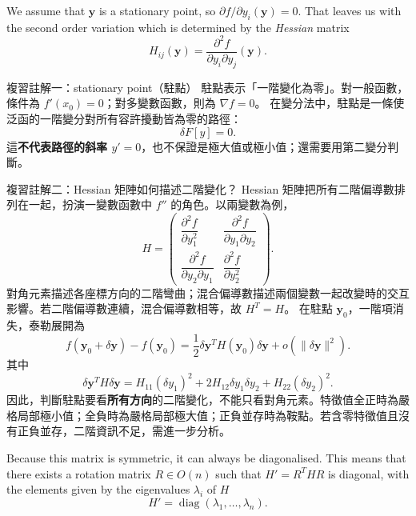\documentclass[11pt,a4paper,twoside]{article}
\newcommand{\pnum}[1]{\makebox[0pt][r]{\scriptsize\textbf{[#1]}\hspace{0.7em}}}
\newcommand{\StudyNote}[2]{\begin{studyNote}{#1}#2\end{studyNote}}
\begin{document}
\noindent\pnum{45}We assume that $\mathbf{y}$ is a stationary point, so $\partial f/\partial y_i(\mathbf{y})=0$. That leaves us with the second order variation which is determined by the \textit{Hessian} matrix
\begin{equation}
    H_{ij}(\mathbf{y})=\frac{\partial^2 f}{\partial y_i\partial y_j}(\mathbf{y}).
    \tag{7.29}
\end{equation}

\StudyNote{複習註解一：stationary point（駐點）}{
    駐點表示「一階變化為零」。對一般函數，條件為 $f'(x_0)=0$；對多變數函數，則為 $\nabla f=0$。
    在變分法中，駐點是一條使泛函的一階變分對所有容許擾動皆為零的路徑：
    \[
        \delta F[y]=0.
    \]
    這\textbf{不代表路徑的斜率 $y'=0$}，也不保證是極大值或極小值；還需要用第二變分判斷。
}
\StudyNote{複習註解二：Hessian 矩陣如何描述二階變化？}{
    Hessian 矩陣把所有二階偏導數排列在一起，扮演一變數函數中 $f''$ 的角色。以兩變數為例，
    \[
        H=\begin{pmatrix}
            \dfrac{\partial^2 f}{\partial y_1^2}           & \dfrac{\partial^2 f}{\partial y_1\partial y_2} \\[2mm]
            \dfrac{\partial^2 f}{\partial y_2\partial y_1} & \dfrac{\partial^2 f}{\partial y_2^2}
        \end{pmatrix}.
    \]
    對角元素描述各座標方向的二階彎曲；混合偏導數描述兩個變數一起改變時的交互影響。若二階偏導數連續，混合偏導數相等，故 $H^T=H$。
    在駐點 $\mathbf y_0$，一階項消失，泰勒展開為
    \[
        f(\mathbf y_0+\delta\mathbf y)-f(\mathbf y_0)
        =\frac12\delta\mathbf y^T H(\mathbf y_0)\delta\mathbf y
        +o(\|\delta\mathbf y\|^2).
    \]
    其中
    \[
        \delta\mathbf y^TH\delta\mathbf y
        =H_{11}(\delta y_1)^2+2H_{12}\delta y_1\delta y_2+H_{22}(\delta y_2)^2.
    \]
    因此，判斷駐點要看\textbf{所有方向}的二階變化，不能只看對角元素。特徵值全正時為嚴格局部極小值；全負時為嚴格局部極大值；正負並存時為鞍點。若含零特徵值且沒有正負並存，二階資訊不足，需進一步分析。
}


\noindent\pnum{46}Because this matrix is symmetric, it can always be diagonalised. This means that there exists a rotation matrix $R\in O(n)$ such that $H'=R^T H R$ is diagonal, with the elements given by the eigenvalues $\lambda_i$ of $H$
\begin{equation}
    H'=\operatorname{diag}(\lambda_1,\ldots,\lambda_n).
    \tag{7.30}
\end{equation}
\end{document}
